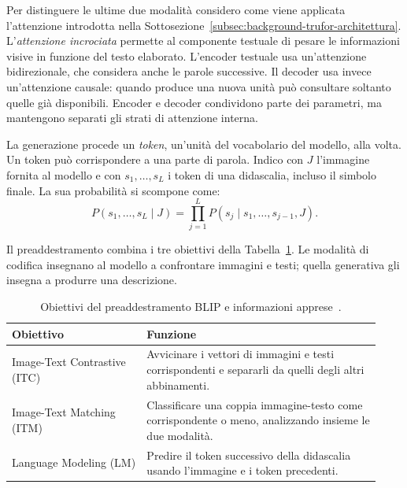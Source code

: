 Per distinguere le ultime due modalità considero come viene applicata l'attenzione introdotta nella Sottosezione~\ref{subsec:background-trufor-architettura}. L'\emph{attenzione incrociata} permette al componente testuale di pesare le informazioni visive in funzione del testo elaborato. L'encoder testuale usa un'attenzione bidirezionale, che considera anche le parole successive. Il decoder usa invece un'attenzione causale: quando produce una nuova unità può consultare soltanto quelle già disponibili. Encoder e decoder condividono parte dei parametri, ma mantengono separati gli strati di attenzione interna.

La generazione procede un \emph{token}, un'unità del vocabolario del modello, alla volta. Un token può corrispondere a una parte di parola. Indico con $J$ l'immagine fornita al modello e con $s_1,\ldots,s_L$ i token di una didascalia, incluso il simbolo finale. La sua probabilità si scompone come:
\begin{equation}
    P(s_1,\ldots,s_L\mid J)
    =\prod_{j=1}^{L}P(s_j\mid s_1,\ldots,s_{j-1},J).
    \label{eq:blip-generazione}
\end{equation}

Il preaddestramento combina i tre obiettivi della Tabella~\ref{tab:blip-obiettivi}. Le modalità di codifica insegnano al modello a confrontare immagini e testi; quella generativa gli insegna a produrre una descrizione.

\begin{table}[htbp]
    \centering
    \small
    \caption{Obiettivi del preaddestramento BLIP e informazioni apprese~\cite{pmlr-v162-li22n}.}
    \label{tab:blip-obiettivi}
    \begin{tabular}{@{}>{\raggedright\arraybackslash}p{0.34\linewidth}>{\raggedright\arraybackslash}p{0.59\linewidth}@{}}
        \toprule
        Obiettivo & Funzione \\
        \midrule
        Image-Text Contrastive (ITC) & Avvicinare i vettori di immagini e testi corrispondenti e separarli da quelli degli altri abbinamenti. \\
        \addlinespace
        Image-Text Matching (ITM) & Classificare una coppia immagine-testo come corrispondente o meno, analizzando insieme le due modalità. \\
        \addlinespace
        Language Modeling (LM) & Predire il token successivo della didascalia usando l'immagine e i token precedenti. \\
        \bottomrule
    \end{tabular}
\end{table}

